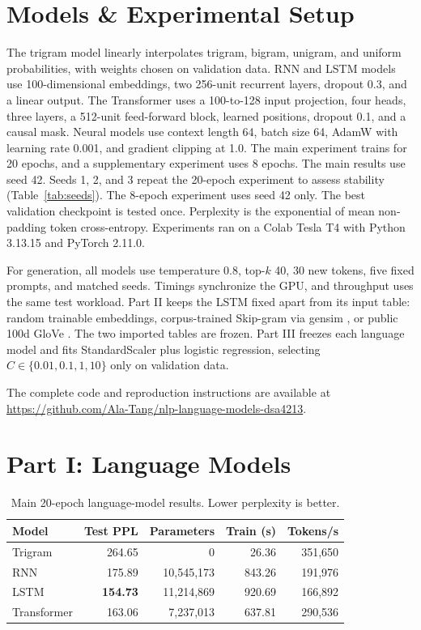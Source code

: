 \documentclass[11pt,a4paper]{article}
\begin{document}
\section{Models \& Experimental Setup}
The trigram model linearly interpolates trigram, bigram, unigram, and uniform probabilities, with
weights chosen on validation data. RNN and LSTM models use 100-dimensional embeddings, two
256-unit recurrent layers, dropout 0.3, and a linear output. The Transformer uses a
100-to-128 input projection, four heads, three layers, a 512-unit feed-forward block, learned
positions, dropout 0.1, and a causal mask. Neural models use context length 64, batch size 64,
AdamW with learning rate 0.001, and gradient clipping at 1.0. The main experiment trains for 20
epochs, and a supplementary experiment uses 8 epochs. The main results use seed 42. Seeds 1, 2,
and 3 repeat the 20-epoch experiment to assess stability (Table~\ref{tab:seeds}). The 8-epoch
experiment uses seed 42 only. The best validation checkpoint is tested once.
Perplexity is the exponential of mean non-padding token cross-entropy. Experiments ran on a
Colab Tesla T4 with Python 3.13.15 and PyTorch 2.11.0.

For generation, all models use temperature 0.8, top-$k$ 40, 30 new tokens, five fixed prompts, and
matched seeds. Timings synchronize the GPU, and throughput uses the same test workload. Part II
keeps the LSTM fixed apart from its input table: random trainable embeddings, corpus-trained
Skip-gram via gensim \citep{rehurek2010gensim}, or public 100d GloVe
\citep{pennington2014glove}. The two imported tables are frozen. Part III freezes each language
model and fits StandardScaler plus logistic regression, selecting $C\in\{0.01,0.1,1,10\}$ only
on validation data.

The complete code and reproduction instructions are available at
\url{https://github.com/Ala-Tang/nlp-language-models-dsa4213}.

\section{Part I: Language Models}
\begin{table}[t]
\centering
\small
\caption{Main 20-epoch language-model results. Lower perplexity is better.}
\begin{tabular}{lrrrr}
\toprule
Model & Test PPL & Parameters & Train (s) & Tokens/s \\
\midrule
Trigram & 264.65 & 0 & 26.36 & 351,650 \\
RNN & 175.89 & 10,545,173 & 843.26 & 191,976 \\
LSTM & \textbf{154.73} & 11,214,869 & 920.69 & 166,892 \\
Transformer & 163.06 & 7,237,013 & 637.81 & 290,536 \\
\bottomrule
\end{tabular}
\label{tab:part1}
\end{table}
\end{document}
